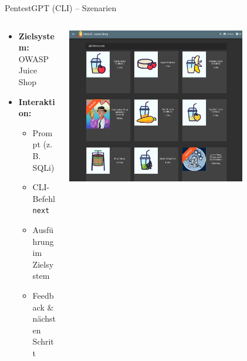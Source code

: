 \documentclass[
	aspectratio=169,	%
	onlytextwidth,		%
	t,					%
	]{beamer}
\begin{document}
\begin{frame}{PentestGPT (CLI) – Szenarien}
	\begin{columns}
		\begin{column}[T]{.4\textwidth}
			\begin{itemize}
				\item \textbf{Zielsystem:}  
				OWASP Juice Shop 
				
				\vspace{2mm}
				
				\item \textbf{Interaktion:}
				\begin{itemize}
					\item Prompt (z. B. SQLi)
					\item CLI-Befehl \texttt{next}
					\item Ausführung im Zielsystem
					\item Feedback \& nächsten Schritt 
				\end{itemize}
			\end{itemize}
		\end{column}
		\begin{column}[T]{.6\textwidth}
			\centering
			\vspace{-4mm}
			\includegraphics[width=0.75\textwidth]{figures/23.png}
			\label{fig:23}
		\end{column}
	\end{columns}
\end{frame}
\end{document}
